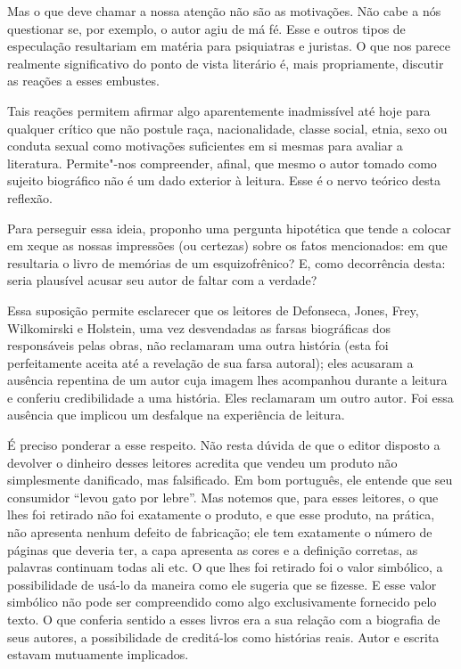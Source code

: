 Mas o que deve chamar a nossa atenção não são as motivações. Não cabe a
nós questionar se, por exemplo, o autor agiu de má fé. Esse e outros
tipos de especulação resultariam em matéria para psiquiatras e juristas.
O que nos parece realmente significativo do ponto de vista literário é,
mais propriamente, discutir as reações a esses embustes.

Tais reações permitem afirmar algo aparentemente inadmissível até hoje
para qualquer crítico que não postule raça, nacionalidade, classe
social, etnia, sexo ou conduta sexual como motivações suficientes em si
mesmas para avaliar a literatura. Permite"-nos compreender, afinal, que
mesmo o autor tomado como sujeito biográfico não é um dado exterior à
leitura. Esse é o nervo teórico desta reflexão.

Para perseguir essa ideia, proponho uma pergunta hipotética que tende a
colocar em xeque as nossas impressões (ou certezas) sobre os fatos
mencionados: em que resultaria o livro de memórias de um esquizofrênico?
E, como decorrência desta: seria plausível acusar seu autor de faltar
com a verdade?

Essa suposição permite esclarecer que os leitores de Defonseca, Jones,
Frey, Wilkomirski e Holstein, uma vez desvendadas as farsas biográficas dos responsáveis pelas obras, não reclamaram uma outra história (esta
foi perfeitamente aceita até a revelação de sua farsa autoral); eles
acusaram a ausência repentina de um autor cuja imagem lhes acompanhou
durante a leitura e conferiu credibilidade a uma história. Eles
reclamaram um outro autor. Foi essa ausência que implicou um desfalque
na experiência de leitura.

É preciso ponderar a esse respeito. Não resta dúvida de que o editor
disposto a devolver o dinheiro desses leitores acredita que vendeu um
produto não simplesmente danificado, mas falsificado. Em bom português,
ele entende que seu consumidor ``levou gato por lebre''. Mas notemos
que, para esses leitores, o que lhes foi retirado não foi exatamente o
produto, e que esse produto, na prática, não apresenta nenhum defeito de
fabricação; ele tem exatamente o número de páginas que deveria ter, a
capa apresenta as cores e a definição corretas, as palavras continuam
todas ali etc. O que lhes foi retirado foi o valor simbólico, a
possibilidade de usá-lo da maneira como ele sugeria que se fizesse. E
esse valor simbólico não pode ser compreendido como algo exclusivamente
fornecido pelo texto. O que conferia sentido a esses livros era a sua
relação com a biografia de seus autores, a possibilidade de creditá-los
como histórias reais. Autor e escrita estavam mutuamente implicados.

